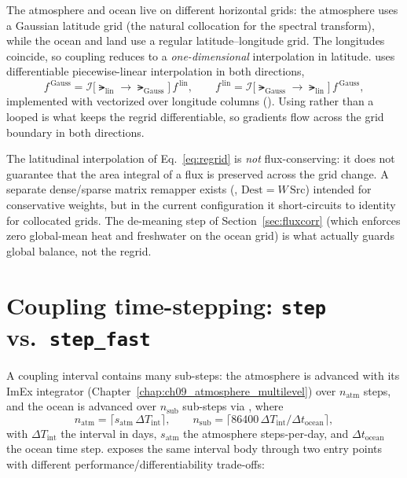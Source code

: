 The atmosphere and ocean live on different horizontal grids: the \dino{}
atmosphere uses a Gaussian latitude grid (the natural collocation for the
spectral transform), while the ocean and land use a regular
latitude--longitude grid. The longitudes coincide, so coupling reduces to a
\emph{one-dimensional} interpolation in latitude. \model{} uses differentiable
piecewise-linear interpolation in both directions,
\begin{equation}
  f^{\,\mathrm{Gauss}} = \mathcal{I}\big[\lat_{\mathrm{lin}}\to\lat_{\mathrm{Gauss}}\big]\,f^{\,\mathrm{lin}},
  \qquad
  f^{\,\mathrm{lin}} = \mathcal{I}\big[\lat_{\mathrm{Gauss}}\to\lat_{\mathrm{lin}}\big]\,f^{\,\mathrm{Gauss}},
  \label{eq:regrid}
\end{equation}
implemented with  vectorized over longitude columns
(). Using  rather than a looped  is
what keeps the regrid differentiable, so gradients flow across the grid boundary
in both directions.

\begin{remark}
The latitudinal interpolation of Eq.~\eqref{eq:regrid} is \emph{not} flux-conserving:
it does not guarantee that the area integral of a flux is preserved across the
grid change. A separate dense/sparse matrix remapper exists
(, $\text{Dest}=W\,\text{Src}$) intended for conservative
weights, but in the current configuration it short-circuits to identity for
collocated grids. The de-meaning step of Section~\ref{sec:fluxcorr} (which
enforces zero global-mean heat and freshwater on the ocean grid) is what actually
guards global balance, not the regrid.
\end{remark}

\section{Coupling time-stepping: \texttt{step} vs.\ \texttt{step\_fast}}

A coupling interval contains many sub-steps: the atmosphere is advanced with its
ImEx integrator (Chapter~\ref{chap:ch09_atmosphere_multilevel}) over
$n_{\mathrm{atm}}$ steps, and the ocean is advanced over $n_{\mathrm{sub}}$
sub-steps via , where
\begin{equation}
  n_{\mathrm{atm}} = \lceil s_{\mathrm{atm}}\,\Delta T_{\mathrm{int}}\rceil,
  \qquad
  n_{\mathrm{sub}} = \big\lceil 86400\,\Delta T_{\mathrm{int}}/\Delta t_{\mathrm{ocean}}\big\rceil,
\end{equation}
with $\Delta T_{\mathrm{int}}$ the interval in days, $s_{\mathrm{atm}}$ the
atmosphere steps-per-day, and $\Delta t_{\mathrm{ocean}}$ the ocean time step.
\model{} exposes the same interval body through two entry points with different
performance/differentiability trade-offs:

